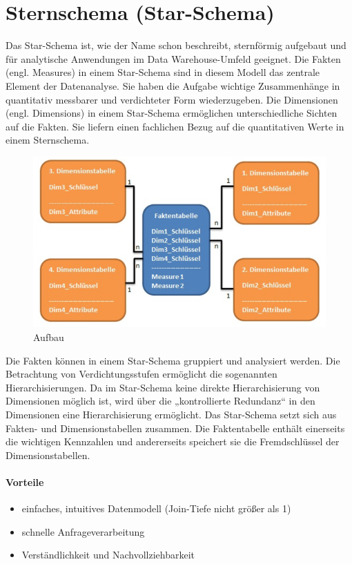 \section{Sternschema (Star-Schema)}

Das Star-Schema ist, wie der Name schon beschreibt, sternförmig aufgebaut und für analytische Anwendungen im Data Warehouse-Umfeld geeignet.
Die Fakten (engl. Measures) in einem Star-Schema sind in diesem Modell das zentrale Element der Datenanalyse. Sie haben die Aufgabe wichtige Zusammenhänge in quantitativ messbarer und verdichteter Form wiederzugeben.
Die Dimensionen (engl. Dimensions) in einem Star-Schema ermöglichen unterschiedliche Sichten auf die Fakten. Sie liefern einen fachlichen Bezug auf die quantitativen Werte in einem Sternschema.

\begin{figure}[H]
    \centering
    \includegraphics[width=.8\textwidth]{Content/images/modellierung/star.png}
    \caption{Aufbau}
    \label{fig:modellierung:star}
\end{figure}

Die Fakten können in einem Star-Schema gruppiert und analysiert werden. Die Betrachtung von Verdichtungsstufen ermöglicht die sogenannten Hierarchisierungen. Da im Star-Schema keine direkte Hierarchisierung von Dimensionen möglich ist, wird über die „kontrollierte Redundanz“ in den Dimensionen eine Hierarchisierung ermöglicht.
Das Star-Schema setzt sich aus Fakten- und Dimensionstabellen zusammen. Die Faktentabelle enthält einerseits die wichtigen Kennzahlen und andererseits speichert sie die Fremdschlüssel der Dimensionstabellen.

\paragraph{Vorteile}
\begin{itemize}
    \item einfaches, intuitives Datenmodell (Join-Tiefe nicht größer als 1)
    \item schnelle Anfrageverarbeitung
    \item Verständlichkeit und Nachvollziehbarkeit
\end{itemize}

